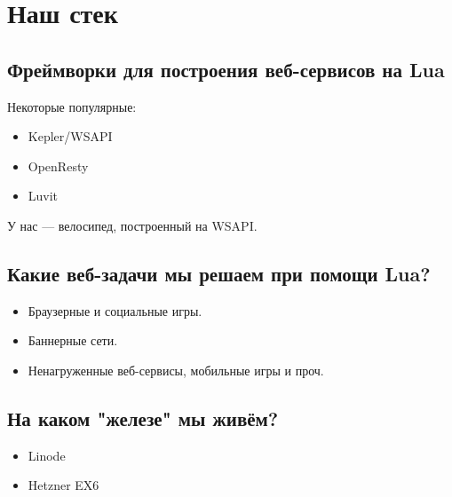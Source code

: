 \documentclass[aspectratio=169,handout,bigger]{beamer}
\begin{document}

\section{Наш стек}


\subsection*{Фреймворки для построения веб-сервисов на Lua}

\begin{frame}
  Некоторые популярные:
  \begin{itemize}
    \item Kepler/WSAPI
    \item OpenResty
    \item Luvit
  \end{itemize}

  У нас — велосипед, построенный на WSAPI.
\end{frame}


\subsection*{Какие веб-задачи мы решаем при помощи Lua?}

\begin{frame}
  \begin{itemize}
    \item Браузерные и социальные игры.
    \item Баннерные сети.
    \item Ненагруженные веб-сервисы, мобильные игры и проч.
  \end{itemize}
\end{frame}


\subsection*{На каком "железе" мы живём?}

\begin{frame}
  \begin{itemize}
    \item Linode
    \item Hetzner EX6
  \end{itemize}
\end{frame}
\end{document}
